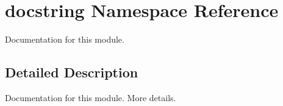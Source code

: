 \hypertarget{namespacedocstring}{\section{docstring Namespace Reference}
\label{namespacedocstring}
}


Documentation for this module.  




\subsection{Detailed Description}
Documentation for this module. More details. 
